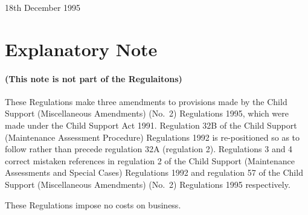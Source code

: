 \documentclass[a4paper]{article}
\newcommand{\parthead}{}
\begin{document}
18th December 1995

\part{Explanatory Note}

\renewcommand\parthead{--- Explanatory Note}

\subsection*{(This note is not part of the Regulaitons)}

These Regulations make three amendments to provisions made by the Child Support (Miscellaneous Amendments) (No.\ 2) Regulations 1995, which were made under the Child Support Act 1991. Regulation 32B of the Child Support (Maintenance Assessment Procedure) Regulations 1992 is re-positioned so as to follow rather than precede regulation 32A (regulation 2). Regulations 3 and 4 correct mistaken references in regulation 2 of the Child Support (Maintenance Assessments and Special Cases) Regulations 1992 and regulation 57 of the Child Support (Miscellaneous Amendments) (No.\ 2) Regulations 1995 respectively.

  These Regulations impose no costs on business.
\end{document}

